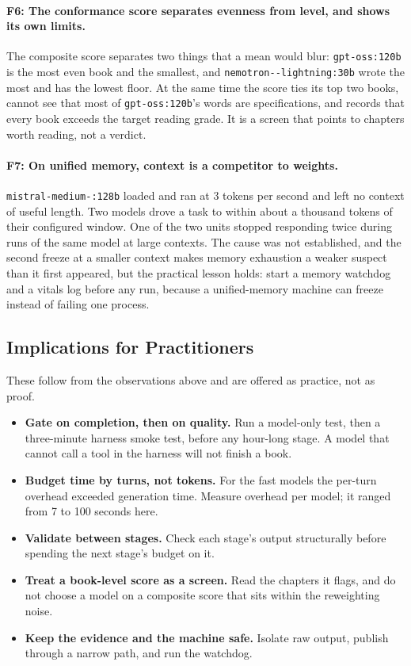 \documentclass[11pt]{article}
\newcommand{\mdl}[1]{\texttt{#1}}
\newcommand{\Nemo}{\mdl{nemotron-\allowbreak 3.5-\allowbreak lightning:30b}}
\newcommand{\Mistral}{\mdl{mistral-\allowbreak medium-\allowbreak 3.5:128b}}
\newcommand{\Gptoss}{\mdl{gpt-oss:120b}}
\begin{document}
\paragraph{F6: The conformance score separates evenness from level, and shows its own limits.}
The composite score separates two things that a mean would blur: \Gptoss{} is the most even book and the smallest, and \Nemo{} wrote the most and has the lowest floor. At the same time the score ties its top two books, cannot see that most of \Gptoss's words are specifications, and records that every book exceeds the target reading grade. It is a screen that points to chapters worth reading, not a verdict.

\paragraph{F7: On unified memory, context is a competitor to weights.}
\Mistral{} loaded and ran at 3 tokens per second and left no context of useful length. Two models drove a task to within about a thousand tokens of their configured window. One of the two units stopped responding twice during runs of the same model at large contexts. The cause was not established, and the second freeze at a smaller context makes memory exhaustion a weaker suspect than it first appeared, but the practical lesson holds: start a memory watchdog and a vitals log before any run, because a unified-memory machine can freeze instead of failing one process.

\subsection{Implications for Practitioners}

These follow from the observations above and are offered as practice, not as proof.

\begin{itemize}
\item \textbf{Gate on completion, then on quality.} Run a model-only test, then a three-minute harness smoke test, before any hour-long stage. A model that cannot call a tool in the harness will not finish a book.
\item \textbf{Budget time by turns, not tokens.} For the fast models the per-turn overhead exceeded generation time. Measure overhead per model; it ranged from 7 to 100 seconds here.
\item \textbf{Validate between stages.} Check each stage's output structurally before spending the next stage's budget on it.
\item \textbf{Treat a book-level score as a screen.} Read the chapters it flags, and do not choose a model on a composite score that sits within the reweighting noise.
\item \textbf{Keep the evidence and the machine safe.} Isolate raw output, publish through a narrow path, and run the watchdog.
\end{itemize}
\end{document}
